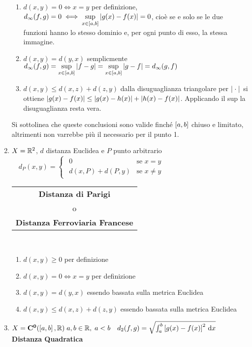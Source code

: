 \begin{example}
\begin{enumerate}
\begin{enumerate}[label=\arabic*.]
				\item $d(x,y) = 0 \iff x = y$ per definizione, $d_\infty(f,g) = 0 \iff \sup\limits_{x\in\left[a,b\right]}\left|g(x)-f(x)\right| = 0$, cioè se e solo se le due funzioni hanno lo stesso dominio e, per ogni punto di esso, la stessa immagine.
				\item $d(x,y)=d(y,x)$ semplicmente $d_{\infty}(f,g) = \sup\limits_{x\in\left[a,b\right]}\left|f-g\right| = \sup\limits_{x\in\left[a,b\right]}\left|g-f\right| = d_{\infty}(g,f)$
				\item $d(x,y) \leq d(x,z) + d(z,y)$ dalla disuguaglianza triangolare per $\left|\;\cdot\;\right|$ si ottiene $\left|g(x)-f(x)\right|\le\left|g(x)-h(x)\right|+\left|h(x)-f(x)\right|$. Applicando il sup la disuguaglianza resta vera.
			\end{enumerate}
			\begin{note}
				Si sottolinea che queste conclusioni sono valide finché $\left[a,b\right]$ chiuso e limitato, altrimenti non varrebbe più il  necessario per il punto 1. %
			\end{note}
		\item $X=\mathbb{R}^2$, $d$ distanza Euclidea e $P$ punto arbitrario\\
			$\quad d_P(x,y)=
			\begin{cases}
				\begin{array}{ll}
					0 & \text{se } x = y\\
					d(x,P) + d(P,y) & \text{se } x \neq y
				\end{array}
			\end{cases}$ \hfill
			{\footnotesize
				\begin{tabular}{c}
					\textbf{Distanza di Parigi}\\
					o\\
					\textbf{Distanza Ferroviaria Francese}
				\end{tabular}
			} \label{ex:dist_parigi}\\
			\begin{enumerate}[label=\arabic*.]
				\item $d(x,y) \geq 0$ per definizione
				\item $d(x,y) = 0 \iff x = y$ per definizione
				\item $d(x,y)=d(y,x)$ essendo bassata sulla metrica Euclidea
				\item $d(x,y) \leq d(x,z) + d(z,y)$ essendo bassata sulla metrica Euclidea
			\end{enumerate}
		\item $X=\mathbf{C^{0}}(\left[a,b\right],\mathbb{R})\;a,b\in\mathbb{R},\;a<b \quad d_2(f,g) = \sqrt{\int_a^b\left[g(x)-f(x)\right]^2 \,\mathrm{d}{x}}$ \hfill {\footnotesize\textbf{Distanza Quadratica}}\\

\end{enumerate}
\end{example}
